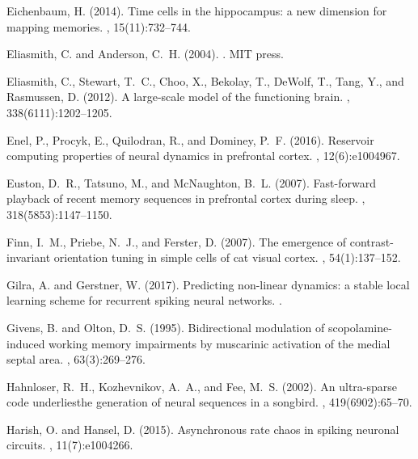 \documentclass[11pt]{article} %
\begin{document}
\begin{thebibliography}{10}
Eichenbaum, H. (2014).
\newblock Time cells in the hippocampus: a new dimension for mapping memories.
, 15(11):732--744.

Eliasmith, C. and Anderson, C.~H. (2004).
.
\newblock MIT press.

Eliasmith, C., Stewart, T.~C., Choo, X., Bekolay, T., DeWolf, T., Tang, Y., and
  Rasmussen, D. (2012).
\newblock A large-scale model of the functioning brain.
, 338(6111):1202--1205.

Enel, P., Procyk, E., Quilodran, R., and Dominey, P.~F. (2016).
\newblock Reservoir computing properties of neural dynamics in prefrontal
  cortex.
, 12(6):e1004967.

Euston, D.~R., Tatsuno, M., and McNaughton, B.~L. (2007).
\newblock Fast-forward playback of recent memory sequences in prefrontal cortex
  during sleep.
, 318(5853):1147--1150.

Finn, I.~M., Priebe, N.~J., and Ferster, D. (2007).
\newblock The emergence of contrast-invariant orientation tuning in simple
  cells of cat visual cortex.
, 54(1):137--152.

Gilra, A. and Gerstner, W. (2017).
\newblock Predicting non-linear dynamics: a stable local learning scheme for
  recurrent spiking neural networks.
.

Givens, B. and Olton, D.~S. (1995).
\newblock Bidirectional modulation of scopolamine-induced working memory
  impairments by muscarinic activation of the medial septal area.
, 63(3):269--276.

Hahnloser, R.~H., Kozhevnikov, A.~A., and Fee, M.~S. (2002).
\newblock An ultra-sparse code underliesthe generation of neural sequences in a
  songbird.
, 419(6902):65--70.

Harish, O. and Hansel, D. (2015).
\newblock Asynchronous rate chaos in spiking neuronal circuits.
, 11(7):e1004266.


\end{thebibliography}
\end{document}
